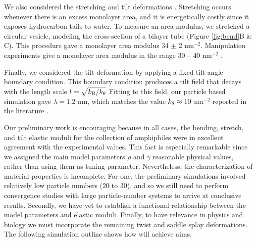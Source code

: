 We also considered the stretching and tilt deformations \cite{Fu2018_SIAM}. 
Stretching occurs whenever there is an excess monolayer area,
and it is energetically costly since it exposes hydrocarbon tails to water.
To measure an area modulus, we stretched a circular vesicle, modeling the cross-section 
of a bilayer tube (Figure \ref{fig:bend}B \& C).
This procedure gave a monolayer area modulus 
34 $\pm$ 2 \kBT \;nm$^{-2}$. Manipulation experiments give a monolayer area modulus in the range 
30 -- 40 \kBT\; nm$^{-2}$ \cite{Nagle17, Nagle17-2}. 

Finally, we considered the tilt deformation by applying a fixed tilt angle boundary condition. 
This boundary condition produces a tilt field that decays with the length scale $l = \sqrt{k_{\mathrm{B}}/k_{\theta}}$ 
Fitting to this field, our particle based simulation gave $\lambda = 1.2$ nm, which matches
the value $k_{\theta} \approx 10$ \kBT \; nm$^{-2}$ reported in the literature \cite{KUZMIN2005, KoNa15}.

Our preliminary work is encouraging because in all cases, the bending, stretch, and tilt elastic moduli for the collection of amphiphiles
were in excellent agreement with the experimental values. This fact is especially remarkable 
since we assigned the main model parameters $\rho$ and $\gamma$ reasonable physical values, rather than using them as tuning parameter. 
Nevertheless, the characterization of material properties is incomplete. For one, the preliminary simulations involved relatively low particle numbers (20 to 30), and so we still need to
perform convergence studies with large particle-number systems to arrive at conclusive results. Secondly, we have yet to establish a functional
relationship between the model parameters and elastic moduli. Finally, to have relevance in physics and biology
we must incorporate the remaining twist and saddle splay deformations.
The following simulation outline shows how will achieve aims.


